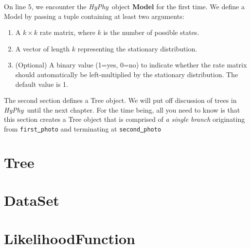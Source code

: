 \documentclass[12pt,twoside,openright]{book}
\newcommand{\hyphy}{\textit{HyPhy}}
\begin{document}
On line 5, we encounter the \hyphy\ object \textbf{Model} for the first time.  We define a Model by passing a tuple containing at least two arguments:
\begin{enumerate}
\item A $k\times k$ rate matrix, where $k$ is the number of possible states.
\item A vector of length $k$ representing the stationary distribution.
\item (Optional) A binary value (1=yes, 0=no) to indicate whether the rate matrix should automatically be left-multiplied by the stationary distribution.  The default value is 1.
\end{enumerate}

The second section defines a Tree object.  We will put off discussion of trees in \hyphy\ until the next chapter.  For the time being, all you need to know is that this section creates a Tree object that is comprised of \textit{a single branch} originating from {\tt first\underline{ }photo} and terminating at {\tt second\underline{ }photo}



\chapter {Tree}



\chapter {DataSet}

\chapter {LikelihoodFunction}




\end{document}
